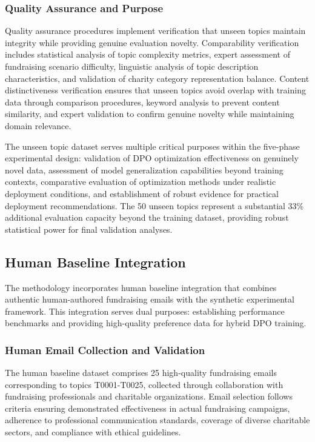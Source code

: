 \subsubsection{Quality Assurance and Purpose}

Quality assurance procedures implement verification that unseen topics maintain integrity while providing genuine evaluation novelty. Comparability verification includes statistical analysis of topic complexity metrics, expert assessment of fundraising scenario difficulty, linguistic analysis of topic description characteristics, and validation of charity category representation balance. Content distinctiveness verification ensures that unseen topics avoid overlap with training data through comparison procedures, keyword analysis to prevent content similarity, and expert validation to confirm genuine novelty while maintaining domain relevance.

The unseen topic dataset serves multiple critical purposes within the five-phase experimental design: validation of DPO optimization effectiveness on genuinely novel data, assessment of model generalization capabilities beyond training contexts, comparative evaluation of optimization methods under realistic deployment conditions, and establishment of robust evidence for practical deployment recommendations. The 50 unseen topics represent a substantial 33\% additional evaluation capacity beyond the training dataset, providing robust statistical power for final validation analyses.

\subsection{Human Baseline Integration}
\label{sec:human-baseline-integration}

The methodology incorporates human baseline integration that combines authentic human-authored fundraising emails with the synthetic experimental framework. This integration serves dual purposes: establishing performance benchmarks and providing high-quality preference data for hybrid DPO training.

\subsubsection{Human Email Collection and Validation}

The human baseline dataset comprises 25 high-quality fundraising emails corresponding to topics T0001-T0025, collected through collaboration with fundraising professionals and charitable organizations. Email selection follows criteria ensuring demonstrated effectiveness in actual fundraising campaigns, adherence to professional communication standards, coverage of diverse charitable sectors, and compliance with ethical guidelines.

